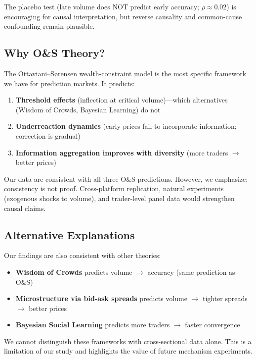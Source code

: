 \documentclass[12pt,letterpaper]{article}
\begin{document}
The placebo test (late volume does NOT predict early accuracy; $\rho \approx 0.02$) is encouraging for causal interpretation, but reverse causality and common-cause confounding remain plausible.

\subsection{Why O\&S Theory?}

The Ottaviani--S{\o}rensen wealth-constraint model is the most specific framework we have for prediction markets. It predicts:
\begin{enumerate}
    \item \textbf{Threshold effects} (inflection at critical volume)---which alternatives (Wisdom of Crowds, Bayesian Learning) do not
    \item \textbf{Underreaction dynamics} (early prices fail to incorporate information; correction is gradual)
    \item \textbf{Information aggregation improves with diversity} (more traders $\rightarrow$ better prices)
\end{enumerate}

Our data are consistent with all three O\&S predictions. However, we emphasize: consistency is not proof. Cross-platform replication, natural experiments (exogenous shocks to volume), and trader-level panel data would strengthen causal claims.

\subsection{Alternative Explanations}

Our findings are also consistent with other theories:
\begin{itemize}
    \item \textbf{Wisdom of Crowds} predicts volume $\rightarrow$ accuracy (same prediction as O\&S)
    \item \textbf{Microstructure via bid-ask spreads} predicts volume $\rightarrow$ tighter spreads $\rightarrow$ better prices
    \item \textbf{Bayesian Social Learning} predicts more traders $\rightarrow$ faster convergence
\end{itemize}

We cannot distinguish these frameworks with cross-sectional data alone. This is a limitation of our study and highlights the value of future mechanism experiments.
\end{document}
